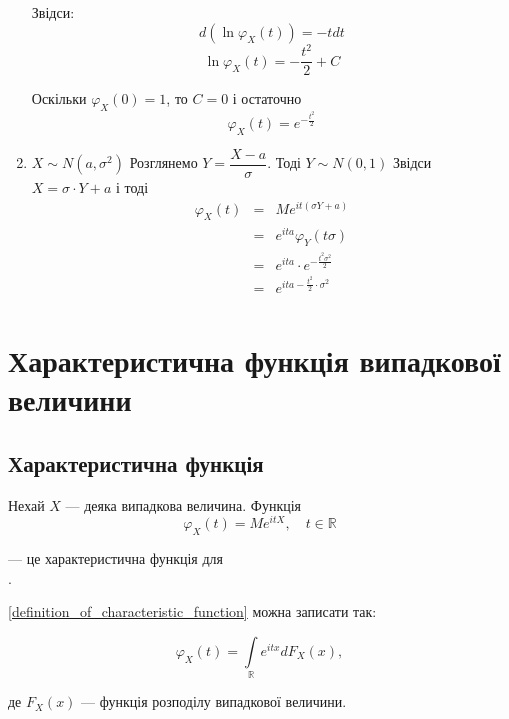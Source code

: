 \begin{example}
\begin{enumerate}
        Звідси:
        $$d(\ln \varphi_X(t)) = -t dt$$
        $$\ln \varphi_X(t) = - \dfrac{t^2}{2} + C$$
        
        Оскільки $\varphi_X(0) = 1$, то $C = 0$ і остаточно
        $$\varphi_X(t) = e^{-\frac{t^2}{2}}$$

    \item $X \sim N(a, \sigma^2)$
        Розглянемо $Y = \dfrac{X-a}{\sigma}$.
        Тоді $Y \sim N(0, 1)$
        Звідси $X = \sigma \cdot Y + a$ і тоді
        $$\begin{array}{rcl}
            \varphi_X(t) & = & M e^{it(\sigma Y + a)} \\
            & = & e^{ita} \varphi_{Y}(t \sigma) \\
            & = & e^{ita} \cdot e^{- \frac{t^2 \sigma^2}{2}} \\
            & = & e^{ita - \frac{t^2}{2} \cdot \sigma^2} \\
        \end{array}$$
\end{enumerate}
\end{example}

\section{Характеристична функція випадкової величини}

\subsection{Характеристична функція}

\begin{definition}
    Нехай $X$ --- деяка випадкова величина.
    Функція
    \begin{equation}
        \label{definition_of_characteristic_function}
        \varphi_X(t) = M e^{itX}, \quad t \in \mathbb{R}
    \end{equation}
    
    --- це характеристична функція для $$$$.
\end{definition}

\ref{definition_of_characteristic_function} можна записати так:

\begin{equation}
    \varphi_X(t) = \int\limits_{\mathbb{R}} e^{itx} dF_X(x),
\end{equation}

де $F_X(x)$ --- функція розподілу випадкової величини.


